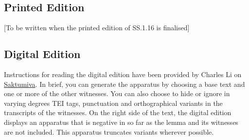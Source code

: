 \subsection{Printed Edition}
[To be written when the printed edition of SS.1.16 is finalised]

\subsection{Digital Edition}
Instructions for reading the digital edition have been provided by Charles Li on 
\href{https://saktumiva.org/wiki/users}{Saktumiva}. In brief, you can 
generate the apparatus by choosing a base text and one or more of the other 
witnesses. You can also choose to hide or ignore in varying degrees TEI 
tags, punctuation and orthographical variants in the transcripts of the witnesses. 
On the right side of the text, the digital edition displays an apparatus that is 
negative in so far as the lemma and its witnesses are not included. This apparatus 
truncates variants wherever possible. 


